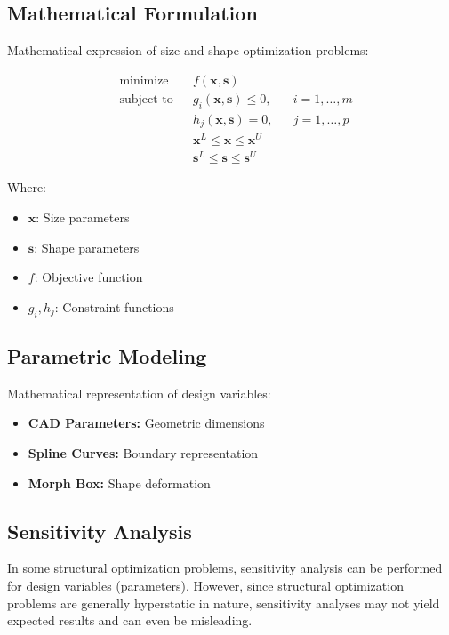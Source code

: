 
\subsection{Mathematical Formulation}
Mathematical expression of size and shape optimization problems:

\begin{equation}
\begin{aligned}
& \text{minimize} & & f(\mathbf{x}, \mathbf{s}) \\
& \text{subject to} & & g_i(\mathbf{x}, \mathbf{s}) \leq 0, & & i = 1,\ldots,m \\
& & & h_j(\mathbf{x}, \mathbf{s}) = 0, & & j = 1,\ldots,p \\
& & & \mathbf{x}^L \leq \mathbf{x} \leq \mathbf{x}^U \\
& & & \mathbf{s}^L \leq \mathbf{s} \leq \mathbf{s}^U
\end{aligned}
\end{equation}

Where:
\begin{itemize}
    \item \(\mathbf{x}\): Size parameters
    \item \(\mathbf{s}\): Shape parameters
    \item \(f\): Objective function
    \item \(g_i, h_j\): Constraint functions
\end{itemize}

\subsection{Parametric Modeling}
Mathematical representation of design variables:

\begin{itemize}
    \item \textbf{CAD Parameters:} Geometric dimensions
    \item \textbf{Spline Curves:} Boundary representation
    \item \textbf{Morph Box:} Shape deformation
\end{itemize}

\subsection{Sensitivity Analysis}
In some structural optimization problems, sensitivity analysis can be performed for design variables (parameters). However, since structural optimization problems are generally hyperstatic in nature, sensitivity analyses may not yield expected results and can even be misleading. 

